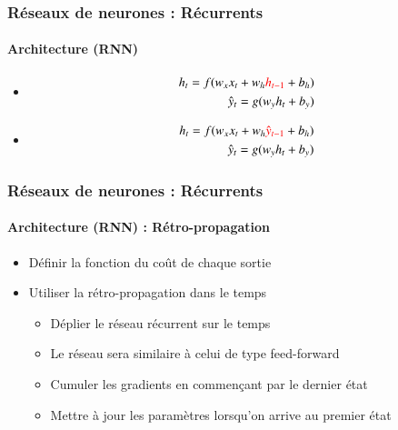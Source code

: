 \documentclass[xcolor=table]{beamer}
\begin{document}
\begin{frame}
\frametitle{Réseaux de neurones : Récurrents}
\framesubtitle{Architecture (RNN)}

\begin{minipage}{0.49\textwidth} 
	\begin{itemize}
		\item {}
		\begin{align*}
		h_t = f(w_x x_t + w_h \textcolor{red}{h_{t-1}} + b_h) \\
		\hat{y}_t = g(w_y h_t + b_y)
		\end{align*}
		\item {}
		\begin{align*}
		h_t = f(w_x x_t + w_h \textcolor{red}{\hat{y}_{t-1}} + b_h) \\
		\hat{y}_t = g(w_y h_t + b_y)
		\end{align*}
	\end{itemize}
\end{minipage}
%
\begin{minipage}{0.5\textwidth}
\end{minipage}

\end{frame}

\begin{frame}
\frametitle{Réseaux de neurones : Récurrents}
\framesubtitle{Architecture (RNN) : Rétro-propagation}

\begin{itemize}
	\item Définir la fonction du coût de chaque sortie
	\item Utiliser la rétro-propagation dans le temps \cite{1990-werbos}  
	\begin{itemize}
		\item Déplier le réseau récurrent sur le temps 
		\item Le réseau sera similaire à celui de type feed-forward 
		\item Cumuler les gradients en commençant par le dernier état 
		\item Mettre à jour les paramètres lorsqu'on arrive au premier état
	\end{itemize}
\end{itemize}


\end{frame}
\end{document}
